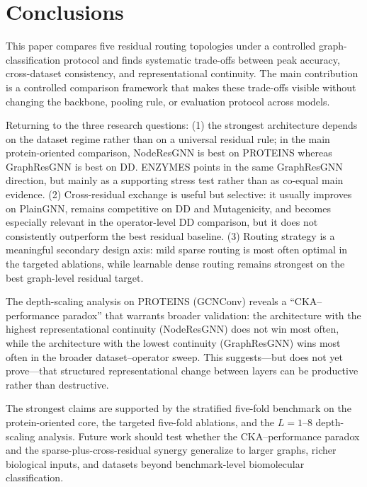 \section{Conclusions}
\label{sec:conclusion}

This paper compares five residual routing topologies under a controlled graph-classification protocol and finds systematic trade-offs between peak accuracy, cross-dataset consistency, and representational continuity. The main contribution is a controlled comparison framework that makes these trade-offs visible without changing the backbone, pooling rule, or evaluation protocol across models.

Returning to the three research questions: (1) the strongest architecture depends on the dataset regime rather than on a universal residual rule; in the main protein-oriented comparison, NodeResGNN is best on PROTEINS whereas GraphResGNN is best on DD. ENZYMES points in the same GraphResGNN direction, but mainly as a supporting stress test rather than as co-equal main evidence. (2) Cross-residual exchange is useful but selective: it usually improves on PlainGNN, remains competitive on DD and Mutagenicity, and becomes especially relevant in the operator-level DD comparison, but it does not consistently outperform the best residual baseline. (3) Routing strategy is a meaningful secondary design axis: mild sparse routing is most often optimal in the targeted ablations, while learnable dense routing remains strongest on the best graph-level residual target.

The depth-scaling analysis on PROTEINS (GCNConv) reveals a ``CKA--performance paradox'' that warrants broader validation: the architecture with the highest representational continuity (NodeResGNN) does not win most often, while the architecture with the lowest continuity (GraphResGNN) wins most often in the broader dataset--operator sweep. This suggests---but does not yet prove---that structured representational change between layers can be productive rather than destructive.

The strongest claims are supported by the stratified five-fold benchmark on the protein-oriented core, the targeted five-fold ablations, and the $L=1$--$8$ depth-scaling analysis. Future work should test whether the CKA--performance paradox and the sparse-plus-cross-residual synergy generalize to larger graphs, richer biological inputs, and datasets beyond benchmark-level biomolecular classification.
